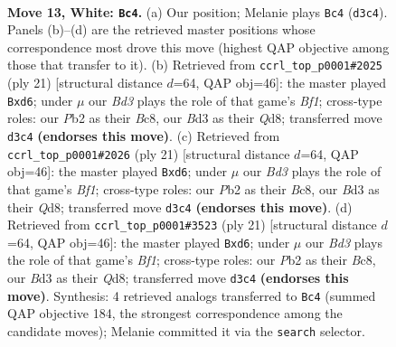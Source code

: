 \documentclass[11pt]{article}
\begin{document}
\clearpage

\begin{figure}[p]\centering
\begin{subfigure}{0.46\textwidth}\centering
\resizebox{\linewidth}{!}{%
\newchessgame
\chessboard[
  setfen={r1bk1b1r/ppq3pp/2p1p3/3nNp2/3P4/1Q1BP3/PP3PPP/R1B1K2R w KQ - 0 13},
  showmover=false,
  pgfstyle=straightmove, color=movearrow, markmove={d3-c4}
]}
\caption{}
\end{subfigure}\hfill
\begin{subfigure}{0.46\textwidth}\centering
\resizebox{\linewidth}{!}{%
\newchessgame
\chessboard[
  setfen={r1bqkb1r/5pp1/p1pPp2p/3n4/6P1/2N4P/PPP2PB1/R1BQK2R b KQkq - 0 11},
  showmover=false,
  pgfstyle=straightmove, color=movearrow, markmove={f8-d6}
]}
\caption{}
\end{subfigure}
\\[4pt]
\begin{subfigure}{0.46\textwidth}\centering
\resizebox{\linewidth}{!}{%
\newchessgame
\chessboard[
  setfen={r1bqkb1r/5pp1/p1pPp2p/3n4/6P1/2N4P/PPP2PB1/R1BQK2R b KQkq - 0 11},
  showmover=false,
  pgfstyle=straightmove, color=movearrow, markmove={f8-d6}
]}
\caption{}
\end{subfigure}\hfill
\begin{subfigure}{0.46\textwidth}\centering
\resizebox{\linewidth}{!}{%
\newchessgame
\chessboard[
  setfen={r1bqkb1r/5pp1/p1pPp2p/3n4/6P1/2N4P/PPP2PB1/R1BQK2R b KQkq - 0 11},
  showmover=false,
  pgfstyle=straightmove, color=movearrow, markmove={f8-d6}
]}
\caption{}
\end{subfigure}
\caption{\textbf{Move 13, White: \texttt{Bc4}.} (a) Our position; Melanie plays \texttt{Bc4} (\texttt{d3c4}). Panels (b)--(d) are the retrieved master positions whose correspondence most drove this move (highest QAP objective among those that transfer to it). (b) Retrieved from \texttt{ccrl\_top\_p0001\#2025} (ply 21) [structural distance $d$=64, QAP obj=46]: the master played \texttt{Bxd6}; under $\mu$ our \emph{Bd3} plays the role of that game's \emph{Bf1}; cross-type roles: our \emph{P}b2 as their \emph{B}c8, our \emph{B}d3 as their \emph{Q}d8; transferred move \texttt{d3c4} \textbf{(endorses this move)}. (c) Retrieved from \texttt{ccrl\_top\_p0001\#2026} (ply 21) [structural distance $d$=64, QAP obj=46]: the master played \texttt{Bxd6}; under $\mu$ our \emph{Bd3} plays the role of that game's \emph{Bf1}; cross-type roles: our \emph{P}b2 as their \emph{B}c8, our \emph{B}d3 as their \emph{Q}d8; transferred move \texttt{d3c4} \textbf{(endorses this move)}. (d) Retrieved from \texttt{ccrl\_top\_p0001\#3523} (ply 21) [structural distance $d$=64, QAP obj=46]: the master played \texttt{Bxd6}; under $\mu$ our \emph{Bd3} plays the role of that game's \emph{Bf1}; cross-type roles: our \emph{P}b2 as their \emph{B}c8, our \emph{B}d3 as their \emph{Q}d8; transferred move \texttt{d3c4} \textbf{(endorses this move)}. Synthesis: 4 retrieved analogs transferred to \texttt{Bc4} (summed QAP objective 184, the strongest correspondence among the candidate moves); Melanie committed it via the \texttt{search} selector.}
\label{fig:thought-m24}
\end{figure}
\end{document}
